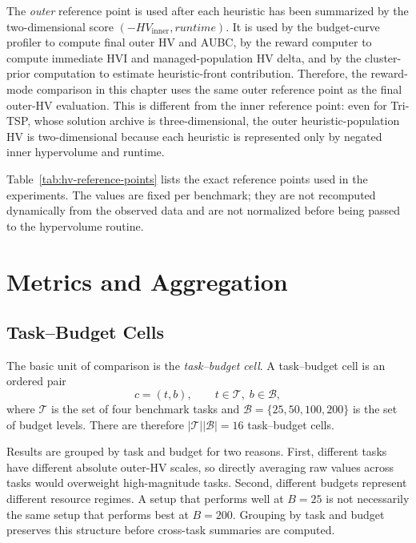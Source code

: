 The \emph{outer} reference point is used after each heuristic has been summarized by the two-dimensional score $(-HV_{\mathrm{inner}}, runtime)$. It is used by the budget-curve profiler to compute final outer HV and AUBC, by the reward computer to compute immediate HVI and managed-population HV delta, and by the cluster-prior computation to estimate heuristic-front contribution. Therefore, the reward-mode comparison in this chapter uses the same outer reference point as the final outer-HV evaluation. This is different from the inner reference point: even for Tri-TSP, whose solution archive is three-dimensional, the outer heuristic-population HV is two-dimensional because each heuristic is represented only by negated inner hypervolume and runtime.

Table~\ref{tab:hv-reference-points} lists the exact reference points used in the experiments. The values are fixed per benchmark; they are not recomputed dynamically from the observed data and are not normalized before being passed to the hypervolume routine.



\section{Metrics and Aggregation}

\subsection{Task--Budget Cells}

The basic unit of comparison is the \emph{task--budget cell}. A task--budget cell is an ordered pair
\begin{equation}
  c=(t,b), \qquad t\in\mathcal{T},\; b\in\mathcal{B},
\end{equation}
where $\mathcal{T}$ is the set of four benchmark tasks and $\mathcal{B}=\{25,50,100,200\}$ is the set of budget levels. There are therefore $|\mathcal{T}||\mathcal{B}|=16$ task--budget cells.

Results are grouped by task and budget for two reasons. First, different tasks have different absolute outer-HV scales, so directly averaging raw values across tasks would overweight high-magnitude tasks. Second, different budgets represent different resource regimes. A setup that performs well at $B=25$ is not necessarily the same setup that performs best at $B=200$. Grouping by task and budget preserves this structure before cross-task summaries are computed.

